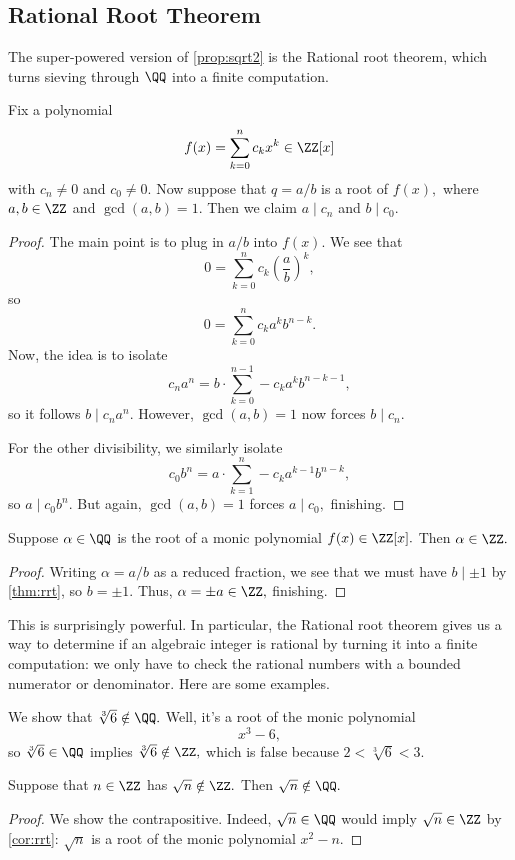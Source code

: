 \documentclass[../notes.tex]{subfiles}
\begin{document}
\subsection{Rational Root Theorem}
The super-powered version of \autoref{prop:sqrt2} is the Rational root theorem, which turns sieving through $\QQ$ into a finite computation.
\begin{thm} \label{thm:rrt}
	Fix a polynomial
	\[f(x)=\sum_{k=0}^nc_kx^k\in\ZZ[x]\]
	with $c_n\ne0$ and $c_0\ne0.$ Now suppose that $q=a/b$ is a root of $f(x),$ where $a,b\in\ZZ$ and $\gcd(a,b)=1.$ Then we claim $a\mid c_n$ and $b\mid c_0.$
\end{thm}
\begin{proof}
	The main point is to plug in $a/b$ into $f(x).$ We see that
	\[0=\sum_{k=0}^nc_k\left(\frac ab\right)^k,\]
	so
	\[0=\sum_{k=0}^nc_ka^kb^{n-k}.\]
	Now, the idea is to isolate
	\[c_na^n=b\cdot\sum_{k=0}^{n-1}-c_ka^kb^{n-k-1},\]
	so it follows $b\mid c_na^n.$ However, $\gcd(a,b)=1$ now forces $\boxed{b\mid c_n}.$
	
	For the other divisibility, we similarly isolate
	\[c_0b^n=a\cdot\sum_{k=1}^n-c_ka^{k-1}b^{n-k},\]
	so $a\mid c_0b^n.$ But again, $\gcd(a,b)=1$ forces $\boxed{a\mid c_0},$ finishing.
\end{proof}
\begin{cor} \label{cor:rrt}
	Suppose $\alpha\in\QQ$ is the root of a monic polynomial $f(x)\in\ZZ[x].$ Then $\alpha\in\ZZ.$
\end{cor}
\begin{proof}
	Writing $\alpha=a/b$ as a reduced fraction, we see that we must have $b\mid\pm1$ by \autoref{thm:rrt}, so $b=\pm1.$ Thus, $\alpha=\pm a\in\ZZ,$ finishing.
\end{proof}
This is surprisingly powerful. In particular, the Rational root theorem gives us a way to determine if an algebraic integer is rational by turning it into a finite computation: we only have to check the rational numbers with a bounded numerator or denominator. Here are some examples.
\begin{ex}
	We show that $\sqrt[3]6\notin\QQ.$ Well, it's a root of the monic polynomial
	\[x^3-6,\]
	so $\sqrt[3]6\in\QQ$ implies $\sqrt[3]6\notin\ZZ,$ which is false because $2<\sqrt[3]6<3.$
\end{ex}
\begin{cor}
	Suppose that $n\in\ZZ$ has $\sqrt n\notin\ZZ.$ Then $\sqrt n\notin\QQ.$
\end{cor}
\begin{proof}
	We show the contrapositive. Indeed, $\sqrt n\in\QQ$ would imply $\sqrt n\in\ZZ$ by \autoref{cor:rrt}: $\sqrt n$ is a root of the monic polynomial $x^2-n.$
\end{proof}
\end{document}
